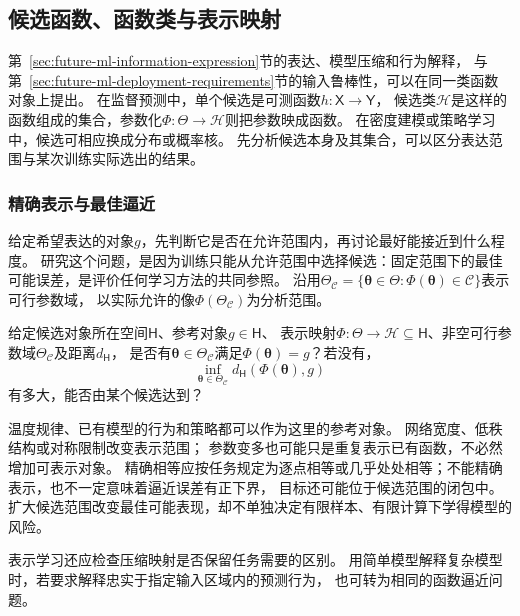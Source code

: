 \subsection{候选函数、函数类与表示映射}
\label{sec:future-core-learning-problem-map}
\label{sec:future-robustness-security-map}

第~\ref{sec:future-ml-information-expression}节的表达、模型压缩和行为解释，
与第~\ref{sec:future-ml-deployment-requirements}节的输入鲁棒性，可以在同一类函数对象上提出。
在监督预测中，单个候选是可测函数$h:\mathsf X\to\mathsf Y$，
候选类$\mathcal H$是这样的函数组成的集合，参数化$\Phi:\Theta\to\mathcal H$则把参数映成函数。
在密度建模或策略学习中，候选可相应换成分布或概率核。
先分析候选本身及其集合，可以区分表达范围与某次训练实际选出的结果。

\subsubsection{精确表示与最佳逼近}
\label{sec:future-analysis-representation}

给定希望表达的对象$g$，先判断它是否在允许范围内，再讨论最好能接近到什么程度。
研究这个问题，是因为训练只能从允许范围中选择候选：固定范围下的最佳可能误差，是评价任何学习方法的共同参照。
沿用$\Theta_{\mathcal C}=\{\bm\theta\in\Theta:\Phi(\bm\theta)\in\mathcal C\}$表示可行参数域，
以实际允许的像$\Phi(\Theta_{\mathcal C})$为分析范围。

\begin{mathproblem}[目标的表示与逼近]
  \label{question:future-representation}
  给定候选对象所在空间$\mathsf H$、参考对象$g\in\mathsf H$、
  表示映射$\Phi:\Theta\to\mathcal H\subseteq\mathsf H$、非空可行参数域$\Theta_{\mathcal C}$及距离$d_{\mathsf H}$，
  是否有$\bm\theta\in\Theta_{\mathcal C}$满足$\Phi(\bm\theta)=g$？若没有，
  \[
    \inf_{\bm\theta\in\Theta_{\mathcal C}}
      d_{\mathsf H}(\Phi(\bm\theta),g)
  \]
  有多大，能否由某个候选达到？
\end{mathproblem}

温度规律、已有模型的行为和策略都可以作为这里的参考对象。
网络宽度、低秩结构或对称限制改变表示范围；
参数变多也可能只是重复表示已有函数，不必然增加可表示对象。
精确相等应按任务规定为逐点相等或几乎处处相等；不能精确表示，也不一定意味着逼近误差有正下界，
目标还可能位于候选范围的闭包中。扩大候选范围改变最佳可能表现，却不单独决定有限样本、有限计算下学得模型的风险。

表示学习还应检查压缩映射是否保留任务需要的区别。
用简单模型解释复杂模型时，若要求解释忠实于指定输入区域内的预测行为，
也可转为相同的函数逼近问题。

